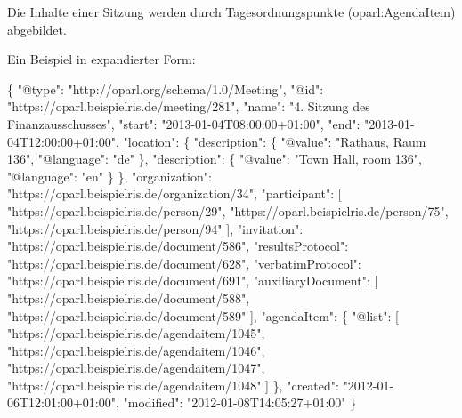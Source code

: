 \documentclass[,a4paper]{article}
\newenvironment{Shaded}{}{}
\newcommand{\DataTypeTok}[1]{\textcolor[rgb]{0.56,0.13,0.00}{{#1}}}
\newcommand{\StringTok}[1]{\textcolor[rgb]{0.25,0.44,0.63}{{#1}}}
\newcommand{\OtherTok}[1]{\textcolor[rgb]{0.00,0.44,0.13}{{#1}}}
\newcommand{\FunctionTok}[1]{\textcolor[rgb]{0.02,0.16,0.49}{{#1}}}
\begin{document}
Die Inhalte einer Sitzung werden durch Tagesordnungspunkte
(oparl:AgendaItem) abgebildet.

Ein Beispiel in expandierter Form:

\begin{Shaded}
\begin{Highlighting}[]
\FunctionTok{\{}
    \DataTypeTok{"@type"}\FunctionTok{:} \StringTok{"http://oparl.org/schema/1.0/Meeting"}\FunctionTok{,}
    \DataTypeTok{"@id"}\FunctionTok{:} \StringTok{"https://oparl.beispielris.de/meeting/281"}\FunctionTok{,}
    \DataTypeTok{"name"}\FunctionTok{:} \StringTok{"4. Sitzung des Finanzausschusses"}\FunctionTok{,}
    \DataTypeTok{"start"}\FunctionTok{:} \StringTok{"2013-01-04T08:00:00+01:00"}\FunctionTok{,}
    \DataTypeTok{"end"}\FunctionTok{:} \StringTok{"2013-01-04T12:00:00+01:00"}\FunctionTok{,}
    \DataTypeTok{"location"}\FunctionTok{:} \FunctionTok{\{}
        \DataTypeTok{"description"}\FunctionTok{:} \FunctionTok{\{}
            \DataTypeTok{"@value"}\FunctionTok{:} \StringTok{"Rathaus, Raum 136"}\FunctionTok{,}
            \DataTypeTok{"@language"}\FunctionTok{:} \StringTok{"de"}
        \FunctionTok{\},}
        \DataTypeTok{"description"}\FunctionTok{:} \FunctionTok{\{}
            \DataTypeTok{"@value"}\FunctionTok{:} \StringTok{"Town Hall, room 136"}\FunctionTok{,}
            \DataTypeTok{"@language"}\FunctionTok{:} \StringTok{"en"}
        \FunctionTok{\}}
    \FunctionTok{\},}
    \DataTypeTok{"organization"}\FunctionTok{:} \StringTok{"https://oparl.beispielris.de/organization/34"}\FunctionTok{,}
    \DataTypeTok{"participant"}\FunctionTok{:} \OtherTok{[}
        \StringTok{"https://oparl.beispielris.de/person/29"}\OtherTok{,}
        \StringTok{"https://oparl.beispielris.de/person/75"}\OtherTok{,}
        \StringTok{"https://oparl.beispielris.de/person/94"}
    \OtherTok{]}\FunctionTok{,}
    \DataTypeTok{"invitation"}\FunctionTok{:} \StringTok{"https://oparl.beispielris.de/document/586"}\FunctionTok{,}
    \DataTypeTok{"resultsProtocol"}\FunctionTok{:} \StringTok{"https://oparl.beispielris.de/document/628"}\FunctionTok{,}
    \DataTypeTok{"verbatimProtocol"}\FunctionTok{:} \StringTok{"https://oparl.beispielris.de/document/691"}\FunctionTok{,}
    \DataTypeTok{"auxiliaryDocument"}\FunctionTok{:} \OtherTok{[}
        \StringTok{"https://oparl.beispielris.de/document/588"}\OtherTok{,}
        \StringTok{"https://oparl.beispielris.de/document/589"}
    \OtherTok{]}\FunctionTok{,}
    \DataTypeTok{"agendaItem"}\FunctionTok{:} \FunctionTok{\{}
        \DataTypeTok{"@list"}\FunctionTok{:} \OtherTok{[}
            \StringTok{"https://oparl.beispielris.de/agendaitem/1045"}\OtherTok{,}
            \StringTok{"https://oparl.beispielris.de/agendaitem/1046"}\OtherTok{,}
            \StringTok{"https://oparl.beispielris.de/agendaitem/1047"}\OtherTok{,}
            \StringTok{"https://oparl.beispielris.de/agendaitem/1048"}
        \OtherTok{]}
    \FunctionTok{\},}
    \DataTypeTok{"created"}\FunctionTok{:} \StringTok{"2012-01-06T12:01:00+01:00"}\FunctionTok{,}
    \DataTypeTok{"modified"}\FunctionTok{:} \StringTok{"2012-01-08T14:05:27+01:00"}
\FunctionTok{\}}
\end{Highlighting}
\end{Shaded}
\end{document}
